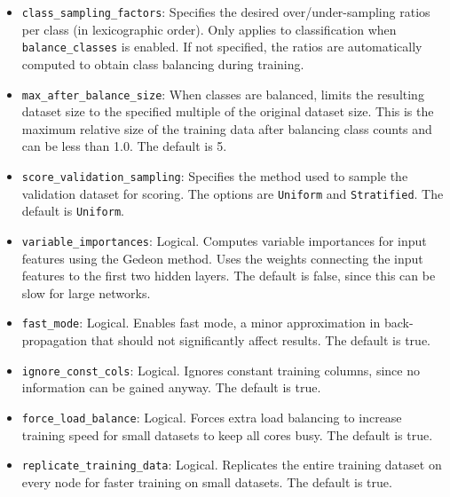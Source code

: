 {{\begin{itemize}
\item \texttt{class\_sampling\_factors}: Specifies the desired over/under-sampling ratios per class (in lexicographic order). Only applies to classification when \texttt{balance\_classes} is enabled. If not specified, the ratios are automatically computed to obtain class balancing during training.

\item \texttt{max\_after\_balance\_size}: When classes are balanced, limits the resulting dataset size to the specified multiple of the original dataset size. This is the maximum relative size of the training data after balancing class counts and can be less than 1.0. The default is 5.

\item \texttt{score\_validation\_sampling}: Specifies the method used to sample the validation dataset for scoring. The options are \texttt{Uniform} and \texttt{Stratified}. The default is \texttt{Uniform}.


\item \texttt{variable\_importances}: Logical. Computes variable importances for input features using the Gedeon method. Uses the weights connecting the input features to the first two hidden layers. The default is false, since this can be slow for large networks. 

\item \texttt{fast\_mode}: Logical. Enables fast mode, a minor approximation in back-propagation that should not significantly affect results. The default is true.

\item \texttt{ignore\_const\_cols}: Logical. Ignores constant training columns, since no information can be gained anyway.  The default is true.

\item \texttt{force\_load\_balance}:  Logical. Forces extra load balancing to increase training speed for small datasets to keep all cores busy. The default is true.

\item \texttt{replicate\_training\_data}:  Logical. Replicates the entire training dataset on every node for faster training on small datasets. The default is true.


\end{itemize}}}
